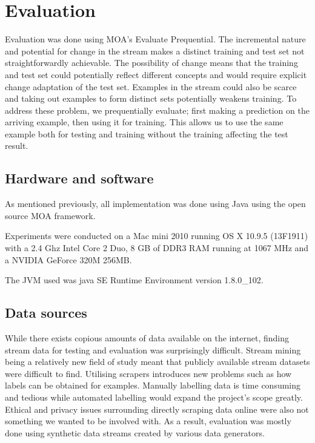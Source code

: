 \chapter{Evaluation}
\label{chapter:Evaluation}
Evaluation was done using MOA's Evaluate Prequential. The incremental nature and potential for change in the stream makes a distinct training and test set not straightforwardly achievable. The possibility of change means that the training and test set could potentially reflect different concepts and would require explicit change adaptation of the test set. Examples in the stream could also be scarce and taking out examples to form distinct sets potentially weakens training. To address these problem, we prequentially evaluate; first making a prediction on the arriving example, then using it for training. This allows us to use the same example both for testing and training without the training affecting the test result.

\section{Hardware and software}
As mentioned previously, all implementation was done using Java using the open source MOA framework.

Experiments were conducted on a Mac mini 2010 running OS X 10.9.5 (13F1911) with a 2.4 Ghz Intel Core 2 Duo, 8 GB of DDR3 RAM running at 1067 MHz and a NVIDIA GeForce 320M 256MB.

The JVM used was java SE Runtime Environment version 1.8.0\_102.

\section{Data sources}
\label{chapter:Evaluation:DataSources}

While there exists copious amounts of data available on the internet, finding stream data for testing and evaluation was surprisingly difficult. Stream mining being a relatively new field of study meant that publicly available stream datasets were difficult to find. Utilising scrapers introduces new problems such as how labels can be obtained for examples. Manually labelling data is time consuming and tedious while automated labelling would expand the project's scope greatly. Ethical and privacy issues surrounding directly scraping data online were also not something we wanted to be involved with. As a result, evaluation was mostly done using synthetic data streams created by various data generators.

